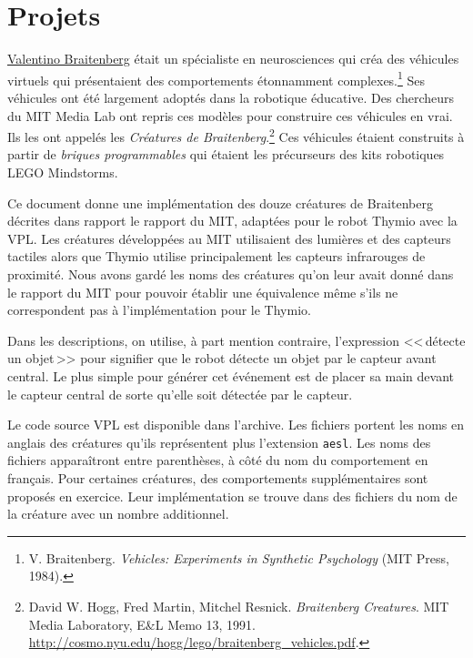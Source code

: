 \part{Projets}

\label{ch.brait}


\href{http://fr.wikipedia.org/wiki/Valentino_Braitenberg}{Valentino Braitenberg}
était un spécialiste en neurosciences qui créa des véhicules virtuels
qui présentaient des comportements étonnamment complexes.\footnote{V. Braitenberg.
\textit{Vehicles: Experiments in Synthetic Psychology} (MIT Press, 1984).}
Ses véhicules ont été largement adoptés dans la robotique éducative.
Des chercheurs du MIT Media Lab ont repris ces modèles pour construire ces véhicules en vrai.
Ils les ont appelés les \emph{Créatures de Braitenberg}.\footnote{David W. Hogg, Fred Martin,
Mitchel Resnick. \textit{Braitenberg Creatures}. MIT Media Laboratory, E\&L Memo 13, 1991.
\href{http://cosmo.nyu.edu/hogg/lego/braitenberg_vehicles.pdf}{http://cosmo.nyu.edu/hogg/lego/braitenberg\_vehicles.pdf}.}
Ces véhicules étaient construits à partir de \emph{briques programmables} qui étaient les
précurseurs des kits robotiques LEGO Mindstorms.

Ce document donne une implémentation des douze créatures de Braitenberg décrites dans
rapport le rapport du MIT, adaptées pour le robot Thymio avec la VPL.
Les créatures développées au MIT utilisaient des lumières et des capteurs tactiles
alors que Thymio utilise principalement les capteurs infrarouges de proximité.
Nous avons gardé les noms des créatures
qu'on leur avait donné dans le rapport du MIT pour pouvoir établir une équivalence même s'ils ne correspondent pas à l'implémentation pour le Thymio.

Dans les descriptions, on utilise, à part mention contraire,
l'expression <<\,détecte un objet\,>> pour signifier
que le robot détecte un objet par le capteur avant central.
Le plus simple pour générer cet événement est de placer sa main
devant le capteur central
de sorte qu'elle soit détectée par le capteur.

Le code source VPL est disponible dans l'archive.
Les fichiers portent les noms en anglais des créatures qu'ils représentent
plus l'extension \texttt{\small aesl}.
Les noms des fichiers apparaîtront entre parenthèses, à côté du nom du comportement en français.
Pour certaines créatures, des comportements supplémentaires sont proposés en exercice.
Leur implémentation se trouve dans des fichiers du nom de la créature avec un nombre additionnel.

